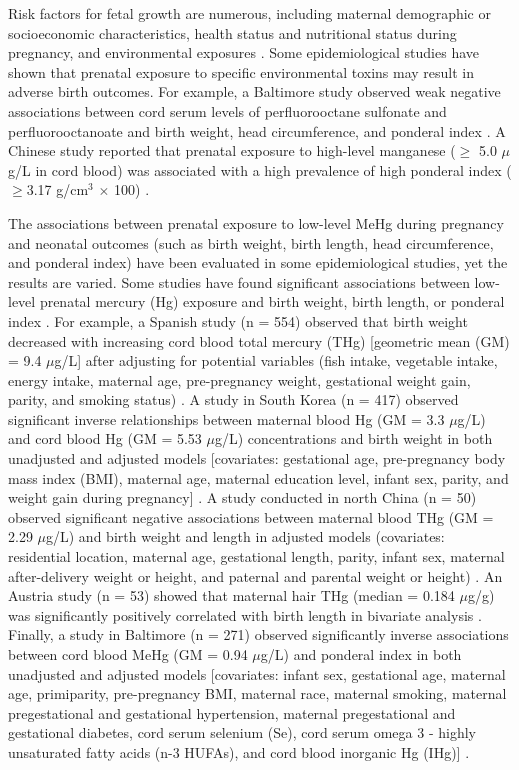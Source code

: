Risk factors for fetal growth are numerous, including maternal demographic or socioeconomic characteristics, health status and nutritional status during pregnancy, and environmental exposures \citep{wardlaw2004low,de2004risk,triche2007environmental,barger2010maternal}. Some epidemiological studies have shown that prenatal exposure to specific environmental toxins may result in adverse birth outcomes. For example, a Baltimore study observed weak negative associations between cord serum levels of perfluorooctane sulfonate and perfluorooctanoate and birth weight, head circumference, and ponderal index \citep{apelberg2007cord}. A Chinese study reported that prenatal exposure to high-level manganese (${\ge}$ 5.0 ${\mu}$g/L in cord blood) was associated with a high prevalence of high ponderal index (${\ge}$3.17 g/cm$^{3}$ \({\times}\) 100) \citep{yu2013elevated}.

The associations between prenatal exposure to low-level MeHg during pregnancy and neonatal outcomes (such as birth weight, birth length, head circumference, and ponderal index) have been evaluated in some epidemiological studies, yet the results are varied. Some studies have found significant associations between low-level prenatal mercury (Hg) exposure and birth weight, birth length, or ponderal index \citep{ramon2010fish,gundacker2010perinatal,lee2010interaction,ou2015low,wells2016cord}. For example, a Spanish study (n = 554) observed that birth weight decreased with increasing cord blood total mercury (THg) [geometric mean (GM) = 9.4 ${\mu}$g/L] after adjusting for potential variables (fish intake, vegetable intake, energy intake, maternal age, pre-pregnancy weight, gestational weight gain, parity, and smoking status) \citep{ramon2010fish}. A study in South Korea (n = 417) observed significant inverse relationships between maternal blood Hg (GM = 3.3 ${\mu}$g/L) and cord blood Hg (GM = 5.53 ${\mu}$g/L) concentrations and birth weight in both unadjusted and adjusted models [covariates: gestational age, pre-pregnancy body mass index (BMI), maternal age, maternal education level, infant sex, parity, and weight gain during pregnancy] \citep{lee2010interaction}. A study conducted in north China (n = 50) observed significant negative associations
between maternal blood THg (GM = 2.29 ${\mu}$g/L) and birth weight and length in adjusted models (covariates: residential location, maternal age, gestational length, parity, infant sex, maternal after-delivery weight or height, and paternal and parental weight or height) \citep{ou2015low}. An Austria study (n = 53) showed that maternal hair THg (median = 0.184 ${\mu}$g/g) was significantly positively correlated with birth length in bivariate analysis \citep{gundacker2010perinatal}. Finally, a study in Baltimore (n = 271) observed significantly inverse associations between cord blood MeHg (GM = 0.94 ${\mu}$g/L) and ponderal index in both unadjusted and adjusted models [covariates: infant sex, gestational age, maternal age, primiparity, pre-pregnancy BMI, maternal race, maternal smoking, maternal pregestational and gestational hypertension, maternal pregestational and gestational diabetes, cord serum selenium (Se), cord serum omega 3 - highly unsaturated fatty acids (n-3 HUFAs), and cord blood inorganic Hg (IHg)] \citep{wells2016cord}.

